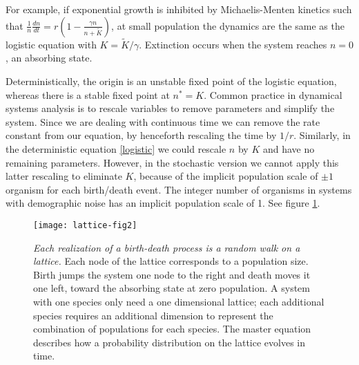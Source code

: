 For example, if exponential growth is inhibited by Michaelis-Menten kinetics such that $\frac{1}{n}\frac{dn}{dt} = r\left(1-\frac{\gamma n}{n+\tilde{K}}\right)$, at small population the dynamics are the same as the logistic equation with $K=\tilde{K}/\gamma$. 
Extinction occurs when the system reaches $n=0$, an absorbing state. %

Deterministically, the origin is an unstable fixed point of the logistic equation, whereas there is a stable fixed point at $n^*=K$. 
Common practice in dynamical systems analysis is to rescale variables to remove parameters and simplify the system. 
Since we are dealing with continuous time we can remove the rate constant from our equation, by henceforth rescaling the time by $1/r$. 
Similarly, in the deterministic equation \ref{logistic} we could rescale $n$ by $K$ and have no remaining parameters. 
However, in the stochastic version we cannot apply this latter rescaling to eliminate $K$, because of the implicit population scale of $\pm1$ organism for each birth/death event. 
The integer number of organisms in systems with demographic noise has an implicit population scale of 1. 
See figure \ref{latticefig}. 

\begin{figure}[h]
	\centering
	\texttt{[image: lattice-fig2]}
	\caption{\emph{Each realization of a birth-death process is a random walk on a lattice.} Each node of the lattice corresponds to a population size. Birth jumps the system one node to the right and death moves it one left, toward the absorbing state at zero population. A system with one species only need a one dimensional lattice; each additional species requires an additional dimension to represent the combination of populations for each species. The master equation describes how a probability distribution on the lattice evolves in time. 
	} \label{latticefig}
\end{figure}

